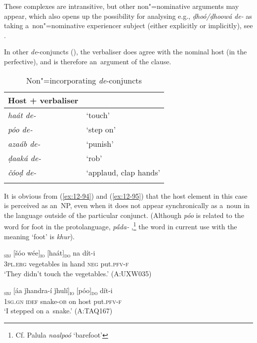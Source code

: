 These complexes are intransitive, but other non"=nominative arguments may appear, which also opens up the possibility for analysing e.g., \textit{ḍhoó/ḍhoowá de-} as taking a~non"=nominative experiencer subject (either explicitly or implicitly), see . 


 In other \textit{de}-conjuncts (), the verbaliser does agree with the nominal host (in the perfective), and is therefore an~argument of the clause. 


\begin{table}[ht]
\caption{Non"=incorporating \textit{de}-conjuncts}
\begin{tabularx}{.75\textwidth}{ l@{\hspace{45pt}} Q }
\lspbottomrule
\textbf{Host + verbaliser} &
\\\hline
\textit{haát de-} &
`touch'\\
\textit{póo de-} &
`step on'\\
\textit{azaáb de-} &
`punish'\\
\textit{ḍaaká de-} &
`rob'\\
\textit{čóoḍ de-} &
`applaud, clap hands'\\\lspbottomrule
\end{tabularx}
\label{tab:12-8}
\end{table}


It is obvious from (\ref{ex:12-94}) and (\ref{ex:12-95}) that the host element in this case is
perceived as an~NP, even when it does not appear synchronically as a~noun in the language outside of
the particular conjunct. (Although \textit{póo} is related to the word for foot in the protolanguage, \textit{p\'{\={a}}da-} \citep[8056]{turner1966},\footnote{Cf. Palula \textit{naalpoó} `barefoot'} the word in current use with the meaning `foot' is
\textit{khur}).

\begin{exe}
\ex
\label{ex:12-94}
\gll [taním]\textsubscript{\textsc{sbj}} [šóo wée]\textsubscript{\textsc{io}} [haát]\textsubscript{\textsc{do}} na dít-i \\
\textsc{3pl.erg} vegetables in hand \textsc{neg} put.\textsc{pfv-f} \\
\glt `They didn't touch the vegetables.' (A:UXW035)
\end{exe}
\begin{exe}
\ex
\label{ex:12-95}
\gll [míi]\textsubscript{\textsc{sbj}} [áa ǰhandra-í ǰhulí]\textsubscript{\textsc{io}} [póo]\textsubscript{\textsc{do}} dít-i  \\
\textsc{1sg.gn} \textsc{idef} snake-\textsc{ob} on host put.\textsc{pfv-f} \\
\glt `I stepped on a~snake.' (A:TAQ167)
\end{exe}

